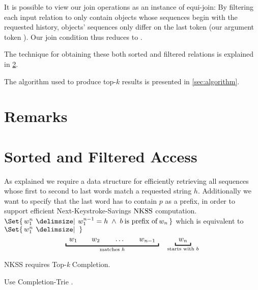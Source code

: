It is possible to view our join operations as an instance of equi-join:
By filtering each input relation  to only contain
objects whose sequences begin with the requested history, objects'
sequences only differ on the last token (our argument token ).
Our join condition thus reduces to
.


The technique for obtaining these both sorted and filtered relations is
explained in \cref{sec:sorted-and-filtered-access}.


The algorithm used to produce top-$k$ results is presented in
\cref{sec:algorithm}.

\section{Remarks}

\section{Sorted and Filtered Access}
\label{sec:sorted-and-filtered-access}

As explained we require a data structure for efficiently retrieving all
sequences whose first to second to last words match a requested string $h$.
Additionally we want to specify that the last word has to contain $p$ as a
prefix, in order to support efficient Next-Keystroke-Savings $\NKSS$
computation.
\mbox{$\Set{\, w_1^n \: \Given \: w_1^{n-1} = h \; \land \; b \:\text{is prefix of}\: w_n \,}$}
which is equivalent to
\mbox{$\Set{\, w_1^n \: \Given \: \,}$}
\begin{equation*}
  \underbracket{\enskip w_1 \qquad w_2 \qquad \ldots \qquad w_{n-1} \enskip}
    _\text{matches $h$}
  \quad
  \underbracket{\enskip w_n \enskip}_\text{starts with $b$}
\end{equation*}

NKSS requires Top-\emph{k} Completion.

Use Completion-Trie \parencite{HsuOttaviano2013}.


